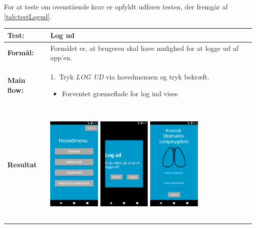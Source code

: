 \noindent
For at teste om ovenstående krav er opfyldt udføres testen, der fremgår af \autoref{tab:testLogud}.

  \begin{longtable}{ | l | p{13cm} |} \hline
    \textbf{Test:} & Log ud \\ \hline
  \textbf{Formål:} & Formålet er, at brugeren skal have mulighed for at logge ud af app’en.
 \\ \hline
 	\textbf{Main flow:} & 1.~Tryk \textit{LOG UD} via hovedmenuen og tryk bekræft.
 	\begin{itemize}
 	\item Forventet grænseflade for log ind vises
 	\end{itemize}	
\\ \hline
\textbf{Resultat} &  \hspace{1.5mm}  \raisebox{-\totalheight}    {\includegraphics[width=0.24\textwidth, height=60mm]{figures/test/logud2}} 
\hspace{5mm}
        \raisebox{-\totalheight}
    {\includegraphics[width=0.24\textwidth, height=60mm]{figures/test/logud3}} 
    \hspace{5mm}
        \raisebox{-\totalheight}
    {\includegraphics[width=0.24\textwidth, height=60mm]{figures/test/logud1}} \vspace{3mm}

\end{longtable}
